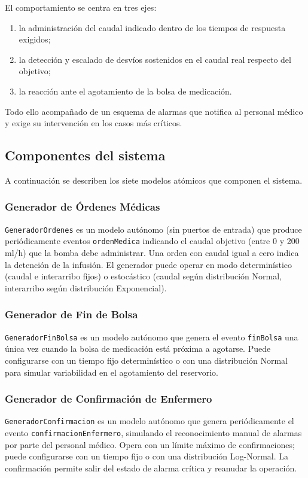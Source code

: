 \documentclass[12pt,a4paper]{article}
\begin{document}
El comportamiento se centra en tres ejes:
\begin{enumerate}
    \item la administración del caudal indicado dentro de los tiempos de
          respuesta exigidos;
    \item la detección y escalado de desvíos sostenidos en el caudal real
          respecto del objetivo;
    \item la reacción ante el agotamiento de la bolsa de medicación.
\end{enumerate}
Todo ello acompañado de un esquema de alarmas que notifica al personal
médico y exige su intervención en los casos más críticos.

\subsection{Componentes del sistema}

A continuación se describen los siete modelos atómicos que componen el
sistema.

\subsubsection{Generador de Órdenes Médicas}
\texttt{GeneradorOrdenes} es un modelo autónomo (sin puertos de entrada)
que produce periódicamente eventos \texttt{ordenMedica} indicando el
caudal objetivo (entre 0 y 200 ml/h) que la bomba debe administrar.  Una
orden con caudal igual a cero indica la detención de la infusión.  El
generador puede operar en modo determinístico (caudal e interarribo fijos)
o estocástico (caudal según distribución Normal, interarribo según
distribución Exponencial).

\subsubsection{Generador de Fin de Bolsa}
\texttt{GeneradorFinBolsa} es un modelo autónomo que genera el evento
\texttt{finBolsa} una única vez cuando la bolsa de medicación está
próxima a agotarse.  Puede configurarse con un tiempo fijo determinístico
o con una distribución Normal para simular variabilidad en el
agotamiento del reservorio.

\subsubsection{Generador de Confirmación de Enfermero}
\texttt{GeneradorConfirmacion} es un modelo autónomo que genera
periódicamente el evento \texttt{confirmacionEnfermero}, simulando el
reconocimiento manual de alarmas por parte del personal médico.  Opera
con un límite máximo de confirmaciones; puede configurarse con un tiempo
fijo o con una distribución Log-Normal.  La confirmación permite salir
del estado de alarma crítica y reanudar la operación.
\end{document}

